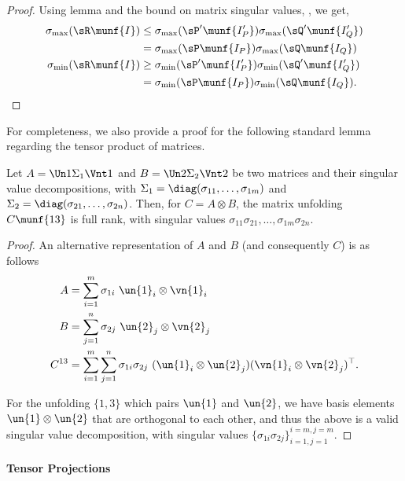 \begin{proof}
Using lemma  and the bound on matrix singular
values, , we get,
\begin{align*}
\sigma_{\max}(\sR\munf{I}) 
    &\le \sigma_{\max}({\sP'}\munf{I'_P}) \sigma_{\max}({\sQ'}\munf{I'_Q}) \\
      &= \sigma_{\max}(\sP\munf{I_P}) \sigma_{\max}(\sQ\munf{I_Q}) \\
    \sigma_{\min}(\sR\munf{I})  
    &\ge \sigma_{\min}({\sP'}\munf{I'_P}) \sigma_{\min}({\sQ'}\munf{I'_Q}) \\
      &= \sigma_{\min}(\sP\munf{I_P}) \sigma_{\min}(\sQ\munf{I_Q}).
\end{align*}
\end{proof}

For completeness, we also provide a proof for the following standard
lemma regarding the tensor product of matrices.

\begin{lemma}
  \label{lem:tensor-prod}
  Let $A = \Un1 \Sigma_1 \Vnt1$ and $B = \Un2 \Sigma_2 \Vnt2$ be two
  matrices and their singular value decompositions, 
  with $\Sigma_1 = \diag(\sigma_{11}, \ldots, \sigma_{1m})$ and $\Sigma_2
  = \diag(\sigma_{21}, \ldots, \sigma_{2n})$. 
  Then, for $C = A \otimes B$, the matrix unfolding $C\munf{13}$ is full
  rank, with singular values $\sigma_{11} \sigma_{21}, \ldots, \sigma_{1m}
  \sigma_{2n}$.
\end{lemma}
\begin{proof}
  An alternative representation of $A$ and $B$ (and consequently $C$) is as follows
  \begin{align*}
    A &= \sum_{i=1}^m \sigma_{1i}~ \un{1}_i \otimes \vn{1}_i \\
    B &= \sum_{j=1}^n \sigma_{2j}~ \un{2}_j \otimes \vn{2}_j \\
    C^{13} &= \sum_{i=1}^m \sum_{j=1}^n \sigma_{1i} \sigma_{2j}~ (\un{1}_i \otimes \un{2}_j)(\vn{1}_i \otimes \vn{2}_j)^\top.
  \end{align*}

  For the unfolding $\{1,3\}$ which pairs $\un{1}$ and $\un{2}$, we have
basis elements $\un{1} \otimes \un{2}$ that are orthogonal to each
other, and thus the above is a valid singular value decomposition,
with singular values $\{ \sigma_{1i} \sigma_{2j} \}_{i=1,j=1}^{i=m,j=m}$. 
\end{proof}

\paragraph{Tensor Projections}

